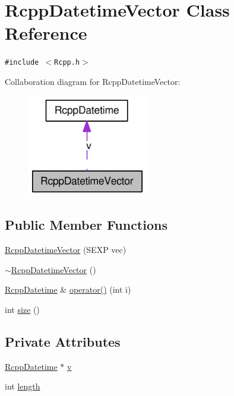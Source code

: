 \hypertarget{classRcppDatetimeVector}{
\section{RcppDatetimeVector Class Reference}
\label{classRcppDatetimeVector}
}
{\tt \#include $<$Rcpp.h$>$}

Collaboration diagram for RcppDatetimeVector:\nopagebreak
\begin{figure}[H]
\begin{center}
\leavevmode
\includegraphics[width=148pt]{classRcppDatetimeVector__coll__graph}
\end{center}
\end{figure}
\subsection*{Public Member Functions}
\begin{CompactItemize}
\item 
\hyperlink{classRcppDatetimeVector_1c1d1e2087fdc8e7601299dc2c4fe24c}{RcppDatetimeVector} (SEXP vec)
\item 
\hyperlink{classRcppDatetimeVector_81d6c5daba7448058a2f896841ddeb3a}{$\sim$RcppDatetimeVector} ()
\item 
\hyperlink{classRcppDatetime}{RcppDatetime} \& \hyperlink{classRcppDatetimeVector_2ffa33b5231a7975652e1e2498d0e16a}{operator()} (int i)
\item 
int \hyperlink{classRcppDatetimeVector_8ca7268098fb2b9250523c4e2ef3c8b7}{size} ()
\end{CompactItemize}
\subsection*{Private Attributes}
\begin{CompactItemize}
\item 
\hyperlink{classRcppDatetime}{RcppDatetime} $\ast$ \hyperlink{classRcppDatetimeVector_0138476000351892e9ec591b2c9ec02f}{v}
\item 
int \hyperlink{classRcppDatetimeVector_e131031fcf2e65b7bfeee3d8e25c4f8c}{length}
\end{CompactItemize}


